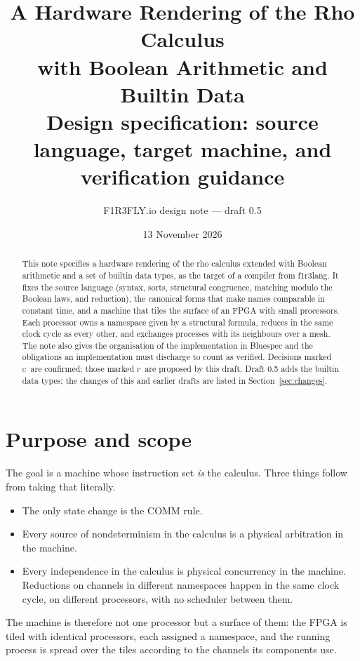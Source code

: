 \documentclass[11pt]{article}
\title{A Hardware Rendering of the Rho Calculus\\with Boolean Arithmetic and Builtin Data\\[4pt]
\large Design specification: source language, target machine, and verification guidance}
\author{F1R3FLY.io design note --- draft 0.5}
\date{13 November 2026}
\newcommand{\conf}{\textsc{c}}
\newcommand{\prop}{\textsc{p}}
\theoremstyle{definition}
\theoremstyle{remark}
\begin{document}
\maketitle

\begin{abstract}
\noindent
This note specifies a hardware rendering of the rho calculus extended with
Boolean arithmetic and a set of builtin data types, as the target of a
compiler from f1r3lang. It fixes the source language (syntax, sorts, structural
congruence, matching modulo the Boolean laws, and reduction), the canonical
forms that make names comparable in constant time, and a machine that tiles
the surface of an FPGA with small processors. Each processor owns a namespace
given by a structural formula, reduces in the same clock cycle as every
other, and exchanges processes with its neighbours over a mesh. The note also
gives the organisation of the implementation in Bluespec and the obligations
an implementation must discharge to count as verified. Decisions marked
\conf\ are confirmed; those marked \prop\ are proposed by this draft.
Draft 0.5 adds the builtin data types; the changes of this and earlier
drafts are listed in Section~\ref{sec:changes}.
\end{abstract}

\tableofcontents

\section{Purpose and scope}

The goal is a machine whose instruction set \emph{is} the calculus. Three
things follow from taking that literally.
\begin{itemize}
\item The only state change is the COMM rule.
\item Every source of nondeterminism in the calculus is a physical
arbitration in the machine.
\item Every independence in the calculus is physical concurrency in the
machine. Reductions on channels in different namespaces happen in the same
clock cycle, on different processors, with no scheduler between them.
\end{itemize}
The machine is therefore not one processor but a surface of them: the FPGA is
tiled with identical processors, each assigned a namespace, and the running
process is spread over the tiles according to the channels its components
use.
\end{document}

